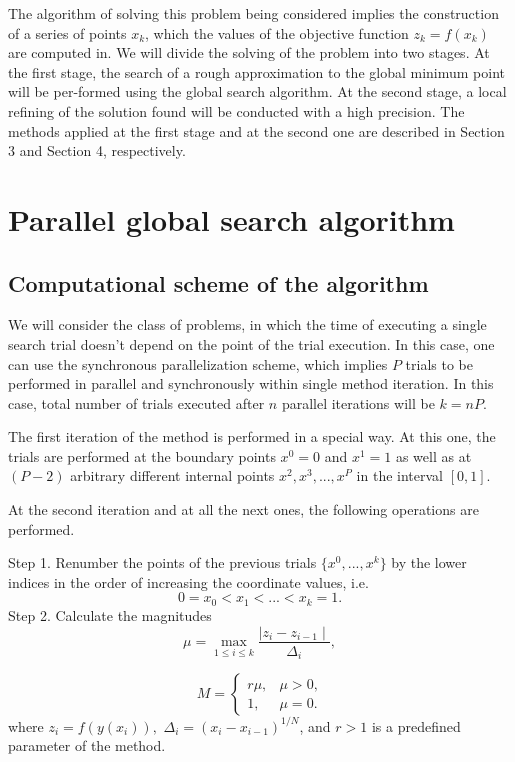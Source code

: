 \documentclass[runningheads]{llncs}
\begin{document}
The algorithm of solving this problem being considered implies the construction of a series of points $x_k$, which the values of the objective function  $z_k = f(x_k)$ are computed in. We will divide the solving of the problem into two stages. At the first stage, the search of a rough approximation to the global minimum point will be per-formed using the global search algorithm. At the second stage, a local refining of the solution found will be conducted with a high precision. The methods applied at the first stage and at the second one are described in Section 3 and Section 4, respectively.

\section{Parallel global search algorithm}
\subsection{Computational scheme of the algorithm}

We will consider the class of problems, in which the time of executing a single search trial doesn’t depend on the point of the trial execution. In this case, one can use the synchronous parallelization scheme, which implies $P$ trials to be performed in parallel and synchronously within single method iteration. In this case, total number of trials executed after $n$ parallel iterations will be $k=nP$.

The first iteration of the method is performed in a special way. At this one, the trials are performed at the boundary points $x^0 = 0$ and $x^1 = 1$ as well as at $(P-2)$ arbitrary different internal points $x^2, x^3, ..., x^P$ in the interval $[0,1]$.

At the second iteration and at all the next ones, the following operations are performed.

Step 1. Renumber the points of the previous trials $\{x^0,...,x^k\}$ by the lower indices in the order of increasing the coordinate values, i.e. 
$$ 0 = x_0 < x_1 < ... < x_k = 1.$$
Step 2. Calculate the magnitudes 
$$ \mu = \max\limits_{1 \leq i \leq k} \frac{\mid z_i - z_{i-1} \mid}{\Delta_i}, $$ 

\begin{displaymath}
M = \left\{ \begin{array}{ll}
                r\mu, & \textrm{$\mu > 0$,}\\
                1, & \textrm{$\mu = 0$}.
  \end{array} \right.
\end{displaymath}
where $z_i = f(y(x_i)),$  $\Delta_i = {(x_i - x_{i-1})}^{1/N}$, and $r > 1$ is a predefined parameter of the method.
\end{document}
